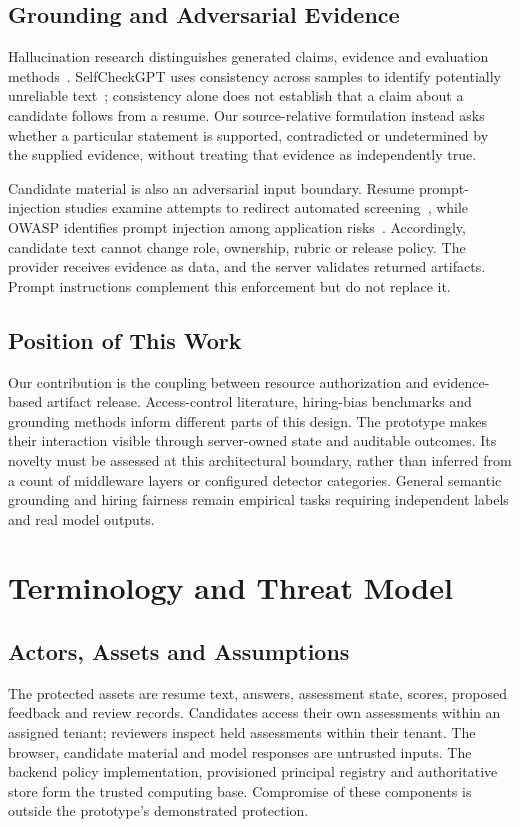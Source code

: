 \documentclass[conference]{IEEEtran}
\begin{document}
\subsection{Grounding and Adversarial Evidence}
Hallucination research distinguishes generated claims, evidence and evaluation methods~\cite{zhang2025sirens}. SelfCheckGPT uses consistency across samples to identify potentially unreliable text~\cite{manakul2023selfcheck}; consistency alone does not establish that a claim about a candidate follows from a resume. Our source-relative formulation instead asks whether a particular statement is supported, contradicted or undetermined by the supplied evidence, without treating that evidence as independently true.

Candidate material is also an adversarial input boundary. Resume prompt-injection studies examine attempts to redirect automated screening~\cite{baxi2026prompt,augey2026rapids}, while OWASP identifies prompt injection among application risks~\cite{owasp2025llm}. Accordingly, candidate text cannot change role, ownership, rubric or release policy. The provider receives evidence as data, and the server validates returned artifacts. Prompt instructions complement this enforcement but do not replace it.

\subsection{Position of This Work}
Our contribution is the coupling between resource authorization and evidence-based artifact release. Access-control literature, hiring-bias benchmarks and grounding methods inform different parts of this design. The prototype makes their interaction visible through server-owned state and auditable outcomes. Its novelty must be assessed at this architectural boundary, rather than inferred from a count of middleware layers or configured detector categories. General semantic grounding and hiring fairness remain empirical tasks requiring independent labels and real model outputs.

\section{Terminology and Threat Model}
\subsection{Actors, Assets and Assumptions}
The protected assets are resume text, answers, assessment state, scores, proposed feedback and review records. Candidates access their own assessments within an assigned tenant; reviewers inspect held assessments within their tenant. The browser, candidate material and model responses are untrusted inputs. The backend policy implementation, provisioned principal registry and authoritative store form the trusted computing base. Compromise of these components is outside the prototype's demonstrated protection.
\end{document}
